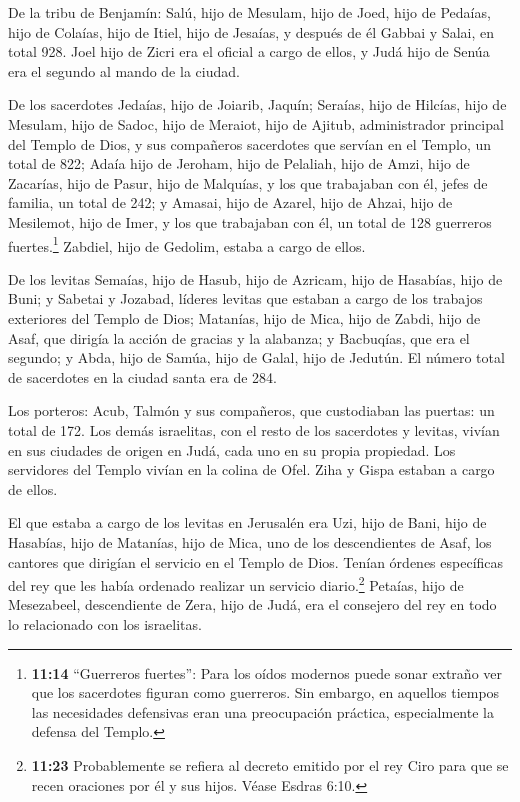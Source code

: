  De la tribu de Benjamín: Salú, hijo de Mesulam, hijo de
Joed, hijo de Pedaías, hijo de Colaías, hijo de Itiel, hijo de Jesaías,
 y después de él Gabbai y Salai, en total 928.
 Joel hijo de Zicri era el oficial a cargo de ellos, y
Judá hijo de Senúa era el segundo al mando de la ciudad.

 De los sacerdotes Jedaías, hijo de Joiarib, Jaquín;
 Seraías, hijo de Hilcías, hijo de Mesulam, hijo de
Sadoc, hijo de Meraiot, hijo de Ajitub, administrador principal del
Templo de Dios,  y sus compañeros sacerdotes que servían
en el Templo, un total de 822; Adaía hijo de Jeroham, hijo de Pelaliah,
hijo de Amzi, hijo de Zacarías, hijo de Pasur, hijo de Malquías,
 y los que trabajaban con él, jefes de familia, un total
de 242; y Amasai, hijo de Azarel, hijo de Ahzai, hijo de Mesilemot, hijo
de Imer,  y los que trabajaban con él, un total de 128
guerreros fuertes.\footnote{\textbf{11:14} ``Guerreros fuertes'': Para
  los oídos modernos puede sonar extraño ver que los sacerdotes figuran
  como guerreros. Sin embargo, en aquellos tiempos las necesidades
  defensivas eran una preocupación práctica, especialmente la defensa
  del Templo.} Zabdiel, hijo de Gedolim, estaba a cargo de ellos.

 De los levitas Semaías, hijo de Hasub, hijo de Azricam,
hijo de Hasabías, hijo de Buni;  y Sabetai y Jozabad,
líderes levitas que estaban a cargo de los trabajos exteriores del
Templo de Dios;  Matanías, hijo de Mica, hijo de Zabdi,
hijo de Asaf, que dirigía la acción de gracias y la alabanza; y
Bacbuqías, que era el segundo; y Abda, hijo de Samúa, hijo de Galal,
hijo de Jedutún.  El número total de sacerdotes en la
ciudad santa era de 284.

 Los porteros: Acub, Talmón y sus compañeros, que
custodiaban las puertas: un total de 172.  Los demás
israelitas, con el resto de los sacerdotes y levitas, vivían en sus
ciudades de origen en Judá, cada uno en su propia propiedad.
 Los servidores del Templo vivían en la colina de Ofel.
Ziha y Gispa estaban a cargo de ellos.

 El que estaba a cargo de los levitas en Jerusalén era
Uzi, hijo de Bani, hijo de Hasabías, hijo de Matanías, hijo de Mica, uno
de los descendientes de Asaf, los cantores que dirigían el servicio en
el Templo de Dios.  Tenían órdenes específicas del rey
que les había ordenado realizar un servicio diario.\footnote{\textbf{11:23}
  Probablemente se refiera al decreto emitido por el rey Ciro para que
  se recen oraciones por él y sus hijos. Véase Esdras 6:10.}
 Petaías, hijo de Mesezabeel, descendiente de Zera, hijo
de Judá, era el consejero del rey en todo lo relacionado con los
israelitas.

